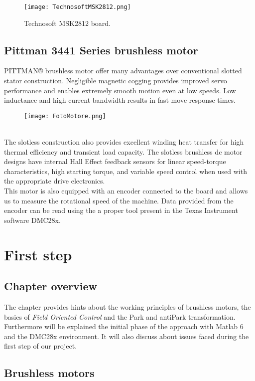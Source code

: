 \documentclass[12pt]{article}
\begin{document}
\begin{figure}[h]
\centering
\texttt{[image: TechnosoftMSK2812.png]}
\caption{\label{fig:setup}Technosoft MSK2812 board.}
\end{figure}

\newpage\subsection{Pittman 3441 Series brushless motor}

PITTMAN® brushless motor offer many advantages over conventional slotted stator construction. Negligible magnetic cogging provides improved servo performance and enables extremely smooth motion even at low speeds. Low inductance and high current bandwidth results in fast move response times. \\
\begin{figure}[h]
\centering
\texttt{[image: FotoMotore.png]}
\end{figure}\\[0.4cm]
The slotless construction also provides excellent winding heat transfer for high thermal efficiency and transient load capacity. The slotless brushless dc motor designs have internal Hall Effect feedback sensors for linear speed-torque characteristics, high starting torque, and variable speed control when used with the appropriate drive electronics.\\
This motor is also equipped with an encoder connected to the board and allows us to measure the rotational speed of the machine.
Data provided from the encoder can be read using the a proper tool present in the Texas Instrument software DMC28x.\\

\section{First step}
\subsection{Chapter overview}
The chapter provides hints about the working principles of brushless motors, the basics of \textit{Field Oriented Control} and the Park and antiPark transformation.
Furthermore will be explained the initial phase of the approach with Matlab 6 and the DMC28x environment.
It will also discuss about issues faced during the first step of our project.

\subsection{Brushless motors}
\end{document}
